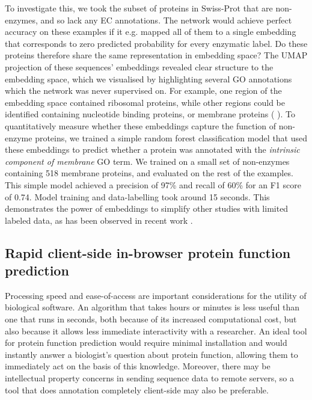 To investigate this, we took the subset of proteins in Swiss-Prot that are non-enzymes, and so lack any EC annotations. The network would achieve perfect accuracy on these examples if it e.g. mapped all of them to a single embedding that corresponds to zero predicted probability for every enzymatic label. Do these proteins therefore share the same representation in embedding space? The UMAP projection of these sequences' embeddings revealed clear structure to the embedding space, which we visualised by highlighting several GO annotations which the network was never supervised on. For example, one region of the embedding space contained ribosomal proteins, while other regions could be identified containing nucleotide binding proteins, or membrane proteins (%
).
To quantitatively measure whether these embeddings capture the function of non-enzyme proteins, we trained a simple random forest classification model that used these embeddings to predict whether a protein was annotated with the \textit{intrinsic component of membrane} GO term. We trained on a small set of non-enzymes containing 518 membrane proteins, and evaluated on the rest of the examples. This simple model achieved a precision of 97\% and recall of 60\% for an F1 score of 0.74. Model training and data-labelling took around 15 seconds. This demonstrates the power of embeddings to simplify other studies with limited labeled data, as has been observed in recent work \citep{Alley589333,biswas2020low}.

\subsection*{Rapid client-side in-browser protein function prediction}
Processing speed and ease-of-access are important considerations for the utility of biological software. An algorithm that takes hours or minutes is less useful than one that runs in seconds, both because of its increased computational cost, but also because it allows less immediate interactivity with a researcher. An ideal tool for protein function prediction would require minimal installation and would instantly answer a biologist's question about protein function, allowing them to immediately act on the basis of this knowledge. Moreover, there may be intellectual property concerns in sending sequence data to remote servers, so a tool that does annotation completely client-side may also be preferable.

